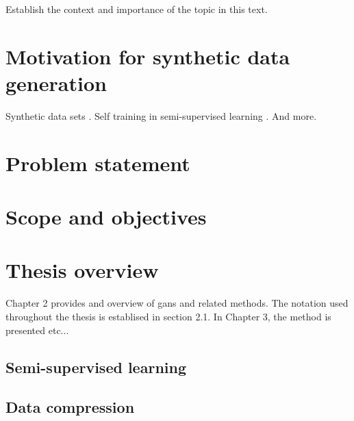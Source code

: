 Establish the context and importance of the topic in this text.

\section{Motivation for synthetic data generation}
Synthetic data sets \textcite{patki2016synthetic}. Self training in semi-supervised learning \cite{wuliu2017selftrainsemisup}. And more.

\section{Problem statement}

\section{Scope and objectives}

\section{Thesis overview}
Chapter 2 provides and overview of \acrlong{gans} and related methods. The notation used throughout the thesis is establised in section 2.1. In Chapter 3, the method is presented etc...

\subsection{Semi-supervised learning}

\subsection{Data compression}

